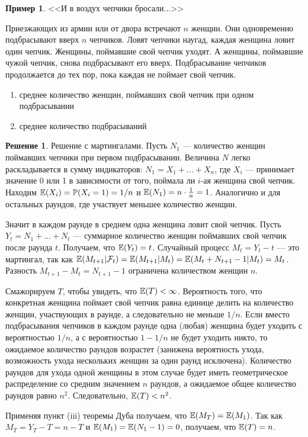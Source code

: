 \documentclass[pdftex,12pt,a4paper]{article}
\numberwithin{equation}{page} %
\theoremstyle{definition} %
\theoremstyle{definition}
\newtheorem{example}[equation]{Пример}
\theoremstyle{definition}
\newtheorem*{solution}{Решение}
\theoremstyle{definition}
\begin{document}
\begin{example} <<И в воздух чепчики бросали...>> %

Приезжающих из армии или от двора встречают $n$ женщин. Они
одновременно подбрасывают вверх $n$ чепчиков. Ловят чепчики
наугад, каждая женщина ловит один чепчик.
Женщины, поймавшие свой чепчик уходят. А женщины,
поймавшие чужой чепчик, снова подбрасывают его вверх.
Подбрасывание чепчиков продолжается до тех пор, пока каждая не
поймает свой чепчик. 

\begin{enumerate}

\item  среднее количество женщин, поймавших свой чепчик при одном подбрасывании

\item среднее количество подбрасываний 
\end{enumerate}
\end{example}

\begin{solution}
Решение с мартингалами. Пусть $N_{1}$ --- количество женщин поймавших чепчики при первом подбрасывании. Величина $N$ легко раскладывается в сумму индикаторов: $N_{1}=X_{1}+...+X_{n}$, где $X_{i}$ --- принимает значение 0 или 1 в зависимости от того, поймала ли $i$-ая женщина свой чепчик. Находим $\mathbb{E}(X_{i})=\mathbb{P}(X_{i}=1)=1/n$ и $\mathbb{E}(N_{1})=n\cdot \frac{1}{n}=1$. Аналогично и для остальных раундов, где участвует меньшее количество женщин.

Значит в каждом раунде в среднем одна женщина ловит свой чепчик. Пусть $Y_{t}=N_{1}+...+N_{t}$ --- суммарное количество женщин поймавших свой чепчик после раунда $t$. Получаем, что $\mathbb{E}(Y_{t})=t$. Случайный процесс $M_{t}=Y_{t}-t$ --- это мартингал, так как $\mathbb{E}(M_{t+1}|\mathcal{F}_{t})=\mathbb{E}(M_{t+1}|M_{t})=\mathbb{E}(M_{t}+N_{t+1}-1|M_{t})=M_{t}$. Разность $M_{t+1}-M_{t}=N_{t+1}-1$ ограничена количеством женщин $n$.

Смажорируем $T$, чтобы увидеть, что $\mathbb{E}(T)<\infty$. Вероятность того, что конкретная женщина поймает свой чепчик равна единице делить на количество женщин, участвующих в раунде, а следовательно не меньше $1/n$. Если вместо подбрасывания чепчиков в каждом раунде одна (любая) женщина будет уходить с вероятностью $1/n$, а с вероятностью $1-1/n$ не будет уходить никто, то ожидаемое количество раундов возрастет (занижена вероятность ухода, возможность ухода нескольких женщин за один раунд исключена). Количество раундов для ухода одной женщины в этом случае будет иметь геометрическое распределение со средним значением $n$ раундов, а ожидаемое общее количество раундов равно $n^{2}$. Следовательно, $\mathbb{E}(T)<n^{2}$.

Применяя пункт (iii) теоремы Дуба получаем, что $\mathbb{E}(M_{T})=\mathbb{E}(M_{1})$. Так как $M_{T}=Y_{T}-T=n-T$ и $\mathbb{E}(M_{1})=\mathbb{E}(N_{1}-1)=0$, получаем, что $\mathbb{E}(T)=n$.
\end{solution}
\end{document}

